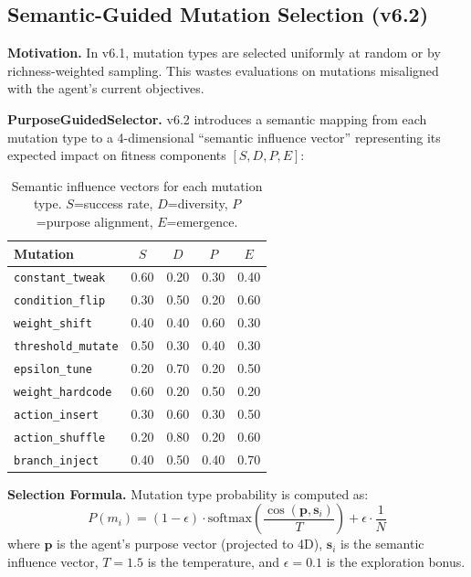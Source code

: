 \documentclass[11pt]{article}
\begin{document}
\subsection{Semantic-Guided Mutation Selection (v6.2)}

\textbf{Motivation.} In v6.1, mutation types are selected uniformly at random or by richness-weighted sampling. This wastes evaluations on mutations misaligned with the agent's current objectives.

\textbf{PurposeGuidedSelector.} v6.2 introduces a semantic mapping from each mutation type to a 4-dimensional ``semantic influence vector'' representing its expected impact on fitness components $[S, D, P, E]$:

\begin{table}[h]
\centering
\small
\begin{tabular}{lcccc}
\toprule
\textbf{Mutation} & $S$ & $D$ & $P$ & $E$ \\
\midrule
\texttt{constant\_tweak}  & 0.60 & 0.20 & 0.30 & 0.40 \\
\texttt{condition\_flip}  & 0.30 & 0.50 & 0.20 & 0.60 \\
\texttt{weight\_shift}    & 0.40 & 0.40 & 0.60 & 0.30 \\
\texttt{threshold\_mutate}& 0.50 & 0.30 & 0.40 & 0.30 \\
\texttt{epsilon\_tune}    & 0.20 & 0.70 & 0.20 & 0.50 \\
\texttt{weight\_hardcode} & 0.60 & 0.20 & 0.50 & 0.20 \\
\texttt{action\_insert}   & 0.30 & 0.60 & 0.30 & 0.50 \\
\texttt{action\_shuffle}  & 0.20 & 0.80 & 0.20 & 0.60 \\
\texttt{branch\_inject}   & 0.40 & 0.50 & 0.40 & 0.70 \\
\bottomrule
\end{tabular}
\caption{Semantic influence vectors for each mutation type. $S$=success rate, $D$=diversity, $P$=purpose alignment, $E$=emergence.}
\label{tab:semantic_vectors}
\end{table}

\textbf{Selection Formula.} Mutation type probability is computed as:
\begin{equation}
P(m_i) = (1-\epsilon) \cdot \text{softmax}\left(\frac{\cos(\mathbf{p}, \mathbf{s}_i)}{T}\right) + \epsilon \cdot \frac{1}{N}
\end{equation}
where $\mathbf{p}$ is the agent's purpose vector (projected to 4D), $\mathbf{s}_i$ is the semantic influence vector, $T=1.5$ is the temperature, and $\epsilon=0.1$ is the exploration bonus.
\end{document}
